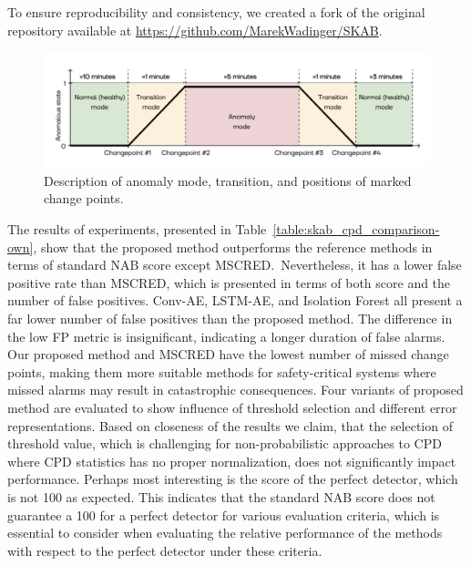To ensure reproducibility and consistency, we created a fork of the original repository available at \url{https://github.com/MarekWadinger/SKAB}.

\begin{figure}[H]
    \centering
    \includegraphics[width=\linewidth]{figures/scab-interpretation.png}
    \caption{Description of anomaly mode, transition, and positions of marked change points.}\label{fig:scab_interpretation}
\end{figure}

The results of experiments, presented in Table~\ref{table:skab_cpd_comparison-own}, show that the proposed method outperforms the reference methods in terms of standard NAB score except MSCRED.~Nevertheless, it has a lower false positive rate than MSCRED, which is presented in terms of both score and the number of false positives. Conv-AE, LSTM-AE, and Isolation Forest all present a far lower number of false positives than the proposed method. The difference in the low FP metric is insignificant, indicating a longer duration of false alarms. Our proposed method and MSCRED have the lowest number of missed change points, making them more suitable methods for safety-critical systems where missed alarms may result in catastrophic consequences. Four variants of proposed method are evaluated to show influence of threshold selection and different error representations. Based on closeness of the results we claim, that the selection of threshold value, which is challenging for non-probabilistic approaches to CPD where CPD statistics has no proper normalization, does not significantly impact performance. Perhaps most interesting is the score of the perfect detector, which is not 100 as expected. This indicates that the standard NAB score does not guarantee a 100 for a perfect detector for various evaluation criteria, which is essential to consider when evaluating the relative performance of the methods with respect to the perfect detector under these criteria.

